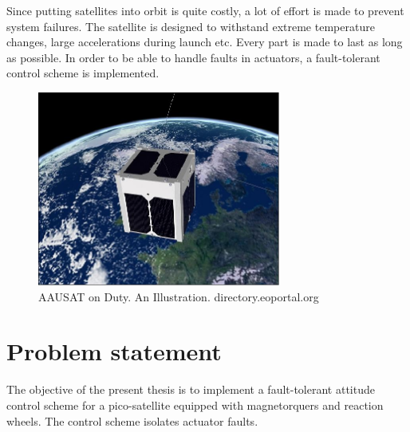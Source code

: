  
 Since putting satellites into orbit is quite costly, a lot of effort is made to prevent system failures. The satellite is designed to withstand extreme temperature changes, large accelerations during launch etc. Every part is made to last as long as possible. In order to be able to handle faults in actuators, a fault-tolerant control scheme is implemented.
 
 
 
 
 \begin{figure}%
 	\centering 
 	\includegraphics[width=80mm]{figures/aausatInSpace.jpg}	
 	\caption{AAUSAT on Duty. An Illustration. directory.eoportal.org}
 	\label{fig:aauinspace}
 \end{figure}

 
  
 

\section{Problem statement}
The objective of the present thesis is to implement a fault-tolerant attitude control scheme for a pico-satellite equipped with magnetorquers and reaction wheels. The control scheme isolates actuator faults.


